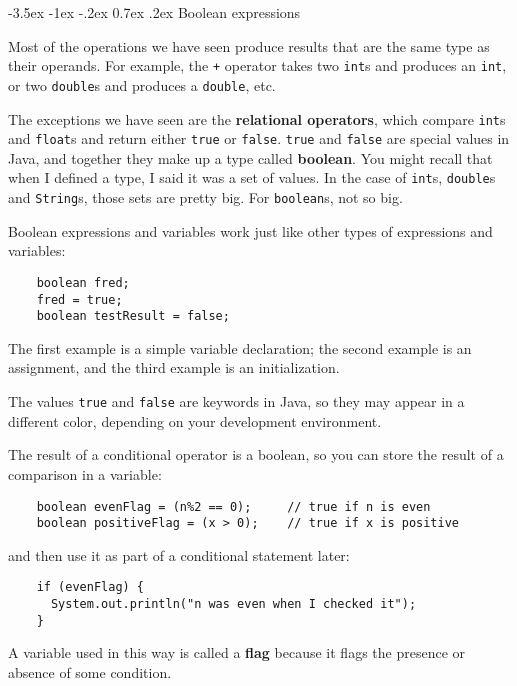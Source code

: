 \documentclass{book}
\makeatletter
\renewcommand{\section}{\@startsection 
    {section} {1} {0mm}%
    {-3.5ex \@plus -1ex \@minus -.2ex}%
    {0.7ex \@plus.2ex}%
    {\normalfont\Large\bfseries}}
\makeatother
\begin{document}
\section{Boolean expressions}

Most of the operations we have seen produce results that are
the same type as their operands.  For example, the {\tt +} operator
takes two {\tt int}s and produces an {\tt int}, or two {\tt double}s
and produces a {\tt double}, etc.


The exceptions we have seen are the {\bf relational operators}, which
compare {\tt int}s and {\tt float}s and return either {\tt true} or
{\tt false}.  {\tt true} and {\tt false} are special values in Java,
and together they make up a type called {\bf boolean}.  You might
recall that when I defined a type, I said it was a set of values.  In
the case of {\tt int}s, {\tt double}s and {\tt String}s, those sets
are pretty big.  For {\tt boolean}s, not so big.

Boolean expressions and variables work just like other types of
expressions and variables:

\begin{verbatim}
    boolean fred;
    fred = true;
    boolean testResult = false;
\end{verbatim}
%
The first example is a simple variable declaration;
the second example is an assignment, and the third example is an
initialization.

The values {\tt true} and {\tt false}
are keywords in Java, so they may appear in a different color,
depending on your development environment.


The result of a conditional operator is a boolean,
so you can store the result of a comparison in a variable:

\begin{verbatim}
    boolean evenFlag = (n%2 == 0);     // true if n is even
    boolean positiveFlag = (x > 0);    // true if x is positive
\end{verbatim}
%
and then use it as part of a conditional statement later:

\begin{verbatim}
    if (evenFlag) {
      System.out.println("n was even when I checked it");
    }
\end{verbatim}
%
A variable used in this way is called a {\bf flag}
because it flags the presence or absence of some condition.
\end{document}

